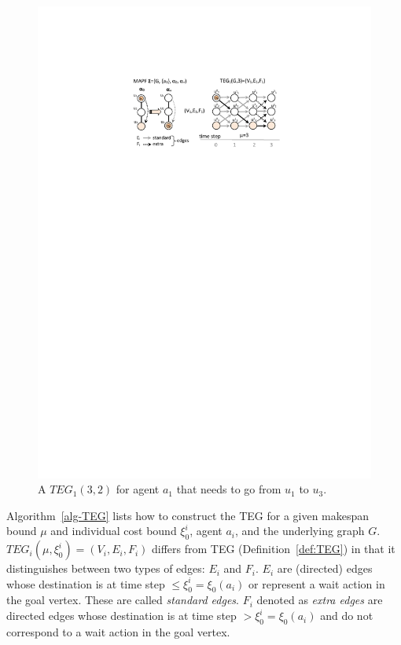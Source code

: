 \documentclass[jair,oneside,11pt]{article}
\begin{document}
\begin{figure}[t]
\centering
\includegraphics[trim={4.5cm 20.7cm 3.5cm 5.5cm},clip,width=1.0\textwidth]{fig_TEGi.pdf}
\caption{A $TEG_1(3,2)$ for agent $a_1$ that needs to go from $u_1$ to $u_3$.}
\label{figure-TEGi}
\end{figure}

Algorithm~\ref{alg-TEG} lists how to construct the TEG for a given makespan bound $\mu$ and individual cost bound $\xi^i_0$, agent $a_i$, and the underlying graph $G$. 
$TEG_i(\mu,\xi^i_0)=(V_i,E_i,F_i)$ differs from TEG (Definition~\ref{def:TEG}) in that it distinguishes between two types of edges: $E_i$ and $F_i$. $E_i$ are (directed) edges whose destination is at time step $\leq{}\xi^i_0=\xi_0(a_i)$ or represent a wait action in the goal vertex. These are called {\em standard edges}. $F_i$ denoted as \textit{extra edges} are directed edges whose destination is at time step $>{}\xi^i_0=\xi_0(a_i)$ and do not correspond to a wait action in the goal vertex.
\end{document}
